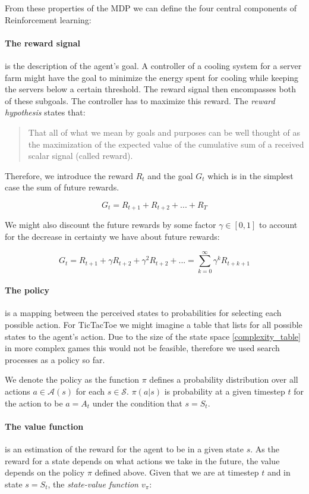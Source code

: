 From these properties of the MDP we can define the four central components of Reinforcement learning:

\paragraph{The reward signal} is the description of the agent's goal. A controller of a cooling system for a server farm might have the goal to minimize the energy spent for cooling while keeping the servers below a certain threshold. The reward signal then encompasses both of these subgoals. The controller has to maximize this reward. The \textit{reward hypothesis} states that:
\begin{quotation}
    That all of what we mean by goals and purposes can be well thought of as the maximization of the expected value of the cumulative sum of a received scalar signal (called reward).
\end{quotation}
Therefore, we introduce the reward $R_t $ and the goal $ G_t $ which is in the simplest case the sum of future rewards.

$$ G_t = R_{t+1} + R_{t+2} + ... + R_T $$

We might also discount the future rewards by some factor $\gamma \in [0, 1] $ to account for the decrease in certainty we have about future rewards:

$$ G_t = R_{t+1} + \gamma R_{t+2} + \gamma^2 R_{t+2} + ... = \sum_{k=0}^{\infty} \gamma^kR_{t+k+1}$$

\paragraph{The policy} is a mapping between the perceived states to probabilities for selecting each possible action. For TicTacToe we might imagine a table that lists for all possible states to the agent's action. Due to the size of the state space \ref{complexity_table} in more complex games this would not be feasible, therefore we used search processes as a policy so far.

We denote the policy as the function $\pi $ defines a probability distribution over all actions $ a \in \mathcal{A}(s)$ for each $ s \in \mathcal{S} $. $ \pi(a|s)$ is probability at a given timestep $t$ for the action to be $ a = A_t $ under the condition that $ s = S_t $.

\paragraph{The value function} is an estimation of the reward for the agent to be in a given state $ s $.  As the reward for a state depends on what actions we take in the future, the value depends on the policy $ \pi $ defined above. Given that we are at timestep $ t $ and in state $ s = S_t $, the \textit{state-value function $v_{\pi}$}:

